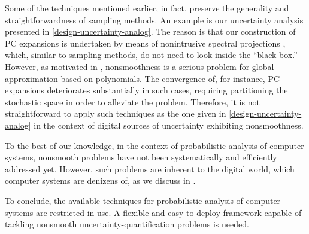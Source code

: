 Some of the techniques mentioned earlier, in fact, preserve the generality and
straightforwardness of sampling methods. An example is our uncertainty analysis
presented in \cref{design-uncertainty-analog}. The reason is that our
construction of \ac{PC} expansions is undertaken by means of nonintrusive
spectral projections \cite{xiu2010}, which, similar to sampling methods, do not
need to look inside the ``black box.'' However, as motivated in
, nonsmoothness is a serious problem for global
approximation based on polynomials. The convergence of, for instance, \ac{PC}
expansions deteriorates substantially in such cases, requiring partitioning the
stochastic space in order to alleviate the problem. Therefore, it is not
straightforward to apply such techniques as the one given in
\cref{design-uncertainty-analog} in the context of digital sources of
uncertainty exhibiting nonsmoothness.

To the best of our knowledge, in the context of probabilistic analysis of
computer systems, nonsmooth problems have not been systematically and
efficiently addressed yet. However, such problems are inherent to the digital
world, which computer systems are denizens of, as we discuss in
.

To conclude, the available techniques for probabilistic analysis of computer
systems are restricted in use. A flexible and easy-to-deploy framework capable
of tackling nonsmooth uncertainty-quantification problems is needed.
